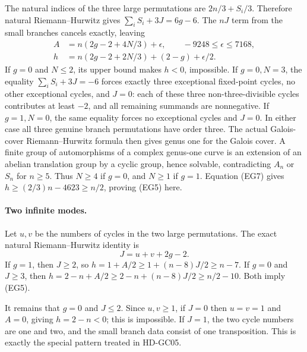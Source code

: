 The natural indices of the three large permutations are
$2n/3+S_i/3$. Therefore natural Riemann--Hurwitz gives
$\sum_i S_i+3J=6g-6$. The $nJ$ term from the small branches
cancels exactly, leaving
\[
 \begin{split}
 A&=n(2g-2+4N/3)+\epsilon,
           \qquad -9248\leq\epsilon\leq7168,\\
 h&=n(2g-2+2N/3)+(2-g)+\epsilon/2.                 \tag{EG7}
 \end{split}
\]
If $g=0$ and $N\leq2$, its upper bound makes $h<0$, impossible.
If $g=0,N=3$, the equality $\sum_iS_i+3J=-6$ forces exactly three
exceptional fixed-point cycles, no other exceptional cycles, and
$J=0$: each of these three non-three-divisible cycles contributes
at least $-2$, and all remaining summands are nonnegative.
If $g=1,N=0$, the same equality forces no exceptional cycles and
$J=0$. In either case all three genuine branch permutations have
order three. The actual Galois-cover Riemann--Hurwitz formula then
gives genus one for the Galois cover. A finite group of automorphisms
of a complex genus-one curve is an extension of an abelian
translation group by a cyclic group, hence solvable, contradicting
$A_n$ or $S_n$ for $n\geq5$.
\cite[Chapter IV, Proposition 7.13 and Remark 7.18, pp.~140--141]{TD:MilneEC2021}
Thus $N\geq4$ if $g=0$, and $N\geq1$ if $g=1$. Equation (EG7)
gives $h\geq(2/3)n-4623\geq n/2$, proving (EG5) here.

\paragraph{Two infinite modes.}
Let $u,v$ be the numbers of cycles in the two large permutations.
The exact natural Riemann--Hurwitz identity is
\[
                         J=u+v+2g-2.               \tag{EG8}
\]
If $g=1$, then $J\geq2$, so
$h=1+A/2\geq1+(n-8)J/2\geq n-7$.
If $g=0$ and $J\geq3$, then
$h=2-n+A/2\geq2-n+(n-8)J/2\geq n/2-10$.
Both imply (EG5).

It remains that $g=0$ and $J\leq2$. Since $u,v\geq1$, if $J=0$
then $u=v=1$ and $A=0$, giving $h=2-n<0$; this is impossible.
If $J=1$, the two cycle numbers are one and two, and the small
branch data consist of one transposition. This is exactly the
special pattern treated in HD-GC05.

